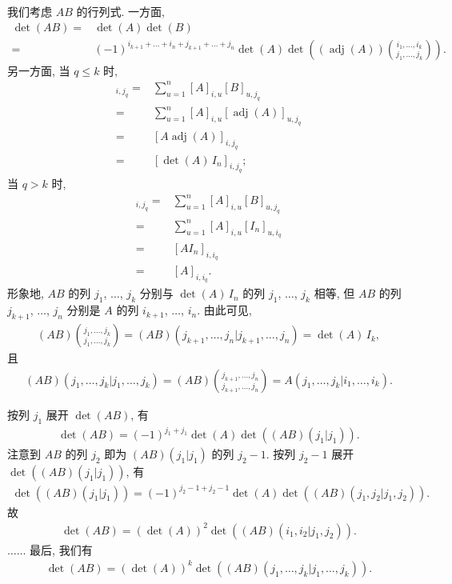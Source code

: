 我们考虑 \(AB\) 的行列式.
一方面,
\begin{align*}
    \det {(AB)}
    = {} & \det {(A)} \det {(B)}
    \\
    = {} & (-1)^{i_{k+1}+\dots+i_n+j_{k+1}+\dots+j_n}
    \det {(A)}
    \det {\left(
        (\operatorname{adj} {(A)})
        \binom{i_1,\dots,i_k}{j_1,\dots,j_k}
        \right)}.
\end{align*}
另一方面, 当 \(q \leq k\) 时,
\begin{align*}
    [AB]_{i,j_q}
    = {} &
    \sum_{u=1}^{n} {[A]_{i,u} [B]_{u,j_q}}
    \\
    = {} &
    \sum_{u=1}^{n} {[A]_{i,u} [\operatorname{adj} {(A)}]_{u,j_q}}
    \\
    = {} &
    [A \operatorname{adj} {(A)}]_{i,j_q}
    \\
    = {} &
    [\det {(A)}\,I_n]_{i,j_q};
\end{align*}
当 \(q > k\) 时,
\begin{align*}
    [AB]_{i,j_q}
    = {} &
    \sum_{u=1}^{n} {[A]_{i,u} [B]_{u,j_q}}
    \\
    = {} &
    \sum_{u=1}^{n} {[A]_{i,u} [I_n]_{u,i_q}}
    \\
    = {} &
    [A I_n]_{i,i_q}
    \\
    = {} &
    [A]_{i,i_q}.
\end{align*}
形象地, \(AB\) 的列 \(j_1\), \(\dots\), \(j_k\)
分别与 \(\det {(A)}\,I_n\) 的列 \(j_1\), \(\dots\), \(j_k\)
相等,
但 \(AB\) 的列 \(j_{k+1}\), \(\dots\), \(j_n\)
分别是 \(A\) 的列 \(i_{k+1}\), \(\dots\), \(i_n\).
由此可见,
\begin{align*}
    (AB)\binom{j_1,\dots,j_k}{j_1,\dots,j_k}
    = (AB)({j_{k+1},\dots,j_n}|{j_{k+1},\dots,j_n})
    = \det {(A)}\, I_k,
\end{align*}
且
\begin{align*}
    (AB)({j_1,\dots,j_k}|{j_1,\dots,j_k})
    = (AB)\binom{j_{k+1},\dots,j_n}{j_{k+1},\dots,j_n}
    = A({j_1,\dots,j_k}|{i_1,\dots,i_k}).
\end{align*}

按列 \(j_1\) 展开 \(\det {(AB)}\), 有
\begin{align*}
    \det {(AB)} = (-1)^{j_1+j_1} \det {(A)}
    \det {((AB)(j_1|j_1))}.
\end{align*}
注意到 \(AB\) 的列 \(j_2\) 即为
\((AB)(j_1|j_1)\) 的列 \(j_2-1\).
按列 \(j_2-1\) 展开 \(\det {((AB)(j_1|j_1))}\),
有
\begin{align*}
    \det {((AB)(j_1|j_1))}
    = (-1)^{j_2-1+j_2-1} \det {(A)}
    \det {((AB)({j_1,j_2}|{j_1,j_2}))}.
\end{align*}
故
\begin{align*}
    \det {(AB)} = (\det {(A)})^2
    \det {((AB)({i_1,i_2}|{j_1,j_2}))}.
\end{align*}
\(\dots \dots\)
最后, 我们有
\begin{align*}
    \det {(AB)}
    = (\det {(A)})^k
    \det {((AB)({j_1,\dots,j_k}|{j_1,\dots,j_k}))}.
\end{align*}

